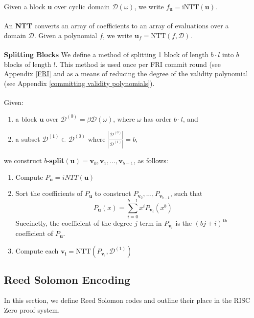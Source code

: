 \documentclass[10pt,letterpaper,titlepage]{article}
\newcommand{\w}[0]{\omega}
\newcommand{\D}[0]{\mathcal{D}}
\theoremstyle{definition}
\begin{document}
\begin{appendices}
Given a block $\mathbf{u}$ over cyclic domain $\D(\w)$, we write $f_{\mathbf{u}}=\text{iNTT}(\mathbf{u})$.  \\
\\
An \textbf{NTT} converts an array of coefficients to an array of evaluations over a domain $\D.$
Given a polynomial $f$, we write $\mathbf{u}_f = \text{NTT}(f,\D)$.\\
\\
\textbf{Splitting Blocks}
\label{split}
We define a method of splitting 1 block of length $b \cdot l$ into $b$ blocks of length $l$.
This method is used once per FRI commit round (see Appendix \ref{FRI} and as a means of reducing the degree of the validity polynomial (see Appendix \ref{committing validity polynomials}).\\
\\
Given:
\begin{enumerate}
  \item a block $\mathbf{u}$ over $\D^{(0)}=\beta\D(\w)$, where $\w$ has order $b \cdot l$, and
  \item a subset $\D^{(1)}\subset\D^{(0)}$ where $\frac{|\D^{(0)}|}{|\D^{(1)}|}=b$,
\end{enumerate}
we construct $b$-\textbf{split}$(\mathbf{u})=\mathbf{v}_0,\mathbf{v}_1,\ldots,\mathbf{v}_{b-1}$, as follows:
\begin{enumerate}
  \item Compute $P_{\mathbf{u}} = iNTT(\mathbf{u})$
  \item Sort the coefficients of $P_{\mathbf{u}}$ to construct $P_{\mathbf{v}_0},\ldots,P_{\mathbf{v}_{b-1}}$, such that
  \[P_{\mathbf{u}}(x)=\sum_{i=0}^{b-1}x^iP_{\mathbf{v}_i}(x^b)\]
  Succinctly, the coefficient of the degree $j$ term in $P_{\mathbf{v}_i}$ is the $(bj+i)^\text{th}$ coefficient of $P_\mathbf{u}$.
  \item Compute each $\mathbf{v_i} = \text{NTT}(P_{\mathbf{v}_i},\D^{(1)})$
\end{enumerate}
\subsection{Reed Solomon Encoding}
\label{reed solomon}
In this section, we define Reed Solomon codes and outline their place in the RISC Zero proof system.

\end{appendices}
\end{document}
